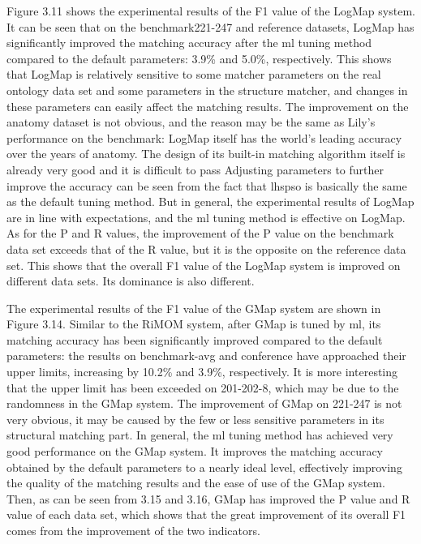 \documentclass[twoside]{article}
\begin{document}
\begin{multicols}{2}
Figure 3.11 shows the experimental results of the F1 value of the LogMap system. 
It can be seen that on the benchmark221-247 and reference datasets, LogMap has significantly improved the matching accuracy after the ml tuning method compared to the default parameters: 3.9\% and 5.0\%, respectively. 
This shows that LogMap is relatively sensitive to some matcher parameters on the real ontology data set and some parameters in the structure matcher, and changes in these parameters can easily affect the matching results. 
The improvement on the anatomy dataset is not obvious, and the reason may be the same as Lily's performance on the benchmark: LogMap itself has the world's leading accuracy over the years of anatomy. The design of its built-in matching algorithm itself is already very good and it is difficult to pass Adjusting parameters to further improve the accuracy can be seen from the fact that lhspso is basically the same as the default tuning method. But in general, the experimental results of LogMap are in line with expectations, and the ml tuning method is effective on LogMap. 
As for the P and R values, the improvement of the P value on the benchmark data set exceeds that of the R value, but it is the opposite on the reference data set. This shows that the overall F1 value of the LogMap system is improved on different data sets. Its dominance is also different.

The experimental results of the F1 value of the GMap system are shown in Figure 3.14. 
Similar to the RiMOM system, after GMap is tuned by ml, its matching accuracy has been significantly improved compared to the default parameters: the results on benchmark-avg and conference have approached their upper limits, increasing by 10.2\% and 3.9\%, respectively. 
It is more interesting that the upper limit has been exceeded on 201-202-8, which may be due to the randomness in the GMap system. 
The improvement of GMap on 221-247 is not very obvious, it may be caused by the few or less sensitive parameters in its structural matching part. 
In general, the ml tuning method has achieved very good performance on the GMap system. It improves the matching accuracy obtained by the default parameters to a nearly ideal level, effectively improving the quality of the matching results and the ease of use of the GMap system. 
Then, as can be seen from 3.15 and 3.16, GMap has improved the P value and R value of each data set, which shows that the great improvement of its overall F1 comes from the improvement of the two indicators.


\end{multicols}
\end{document}
